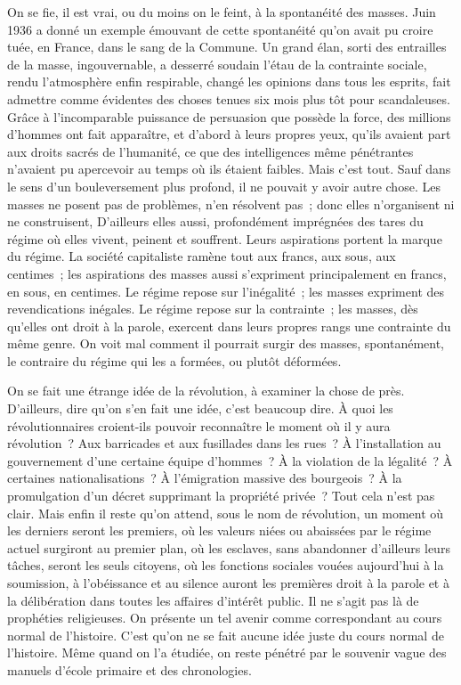\documentclass[french,twoside]{book} %
\begin{document}
On se fie, il est vrai, ou du moins on le feint, à la spontanéité des masses. Juin 1936 a donné un exemple émouvant de cette spontanéité qu'on avait pu croire tuée, en France, dans le sang de la Commune. Un grand élan, sorti des entrailles de la masse, ingouvernable, a desserré soudain l'étau de la contrainte sociale, rendu l'atmosphère enfin respirable, changé les opinions dans tous les esprits, fait admettre comme évidentes des choses tenues six mois plus tôt pour scandaleuses. Grâce à l'incomparable puissance de persuasion que possède la force, des millions d'hommes ont fait apparaître, et d'abord à leurs propres yeux, qu'ils avaient part aux droits sacrés de l'humanité, ce que des intelligences même pénétrantes n'avaient pu apercevoir au temps où ils étaient faibles. Mais c'est tout. Sauf dans le sens d'un bouleversement plus profond, il ne pouvait y avoir autre chose. Les masses ne posent pas de problèmes, n'en résolvent pas ; donc elles n’organisent ni ne construisent, D'ailleurs elles aussi, profondément imprégnées des tares du régime où elles vivent, peinent et souffrent. Leurs aspirations portent la marque du régime. La société capitaliste ramène tout aux francs, aux sous, aux centimes ; les aspirations des masses aussi s'expriment principalement en francs, en sous, en centimes. Le régime repose sur l'inégalité ; les masses expriment des revendications inégales. Le régime repose sur la contrainte ; les masses, dès qu'elles ont droit à la parole, exercent dans leurs propres rangs une contrainte du même genre. On voit mal comment il pourrait surgir des masses, spontanément, le contraire du régime qui les a formées, ou plutôt déformées.\par
On se fait une étrange idée de la révolution, à examiner la chose de près. D'ailleurs, dire qu'on s'en fait une idée, c'est beaucoup dire. À quoi les révolutionnaires croient-ils pouvoir reconnaître le moment où il y aura révolution ? Aux barricades et aux fusillades dans les rues ? À l'installation au gouvernement d'une certaine équipe d'hommes ? À la violation de la légalité ? À certaines nationalisations ? À l'émigration massive des bourgeois ? À la promulgation d'un décret supprimant la propriété privée ? Tout cela n'est pas clair. Mais enfin il reste qu'on attend, sous le nom de révolution, un moment où les derniers seront les premiers, où les valeurs niées ou abaissées par le régime actuel surgiront au premier plan, où les esclaves, sans abandonner d'ailleurs leurs tâches, seront les seuls citoyens, où les fonctions sociales vouées aujourd'hui à la soumission, à l'obéissance et au silence auront les premières droit à la parole et à la délibération dans toutes les affaires d'intérêt public. Il ne s'agit pas là de prophéties religieuses. On présente un tel avenir comme correspondant au cours normal de l'histoire. C'est qu'on ne se fait aucune idée juste du cours normal de l'histoire. Même quand on l'a étudiée, on reste pénétré par le souvenir vague des manuels d'école primaire et des chronologies.\par
\end{document}

